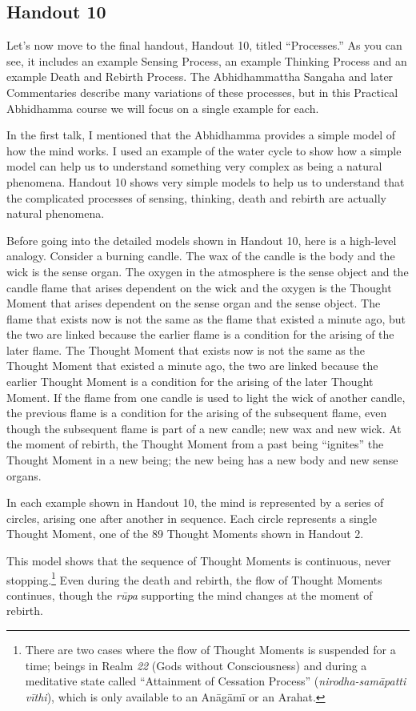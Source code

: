 \subsection*{Handout 10}

Let’s now move to the final handout, Handout 10, titled “Processes.” As you can see, it includes an example Sensing Process, an example Thinking Process and an example Death and Rebirth Process. The Abhidhammattha Sangaha and later Commentaries describe many variations of these processes, but in this Practical Abhidhamma course we will focus on a single example for each.

In the first talk, I mentioned that the Abhidhamma provides a simple model of how the mind works. I used an example of the water cycle to show how a simple model can help us to understand something very complex as being a natural phenomena. Handout 10 shows very simple models to help us to understand that the complicated processes of sensing, thinking, death and rebirth are actually natural phenomena.

Before going into the detailed models shown in Handout 10, here is a high-level analogy. Consider a burning candle. The wax of the candle is the body and the wick is the sense organ. The oxygen in the atmosphere is the sense object and the candle flame that arises dependent on the wick and the oxygen is the Thought Moment that arises dependent on the sense organ and the sense object. The flame that exists now is not the same as the flame that existed a minute ago, but the two are linked because the earlier flame is a condition for the arising of the later flame. The Thought Moment that exists now is not the same as the Thought Moment that existed a minute ago, the two are linked because the earlier Thought Moment is a condition for the arising of the later Thought Moment. If the flame from one candle is used to light the wick of another candle, the previous flame is a condition for the arising of the subsequent flame, even though the subsequent flame is part of a new candle; new wax and new wick. At the moment of rebirth, the Thought Moment from a past being “ignites” the Thought Moment in a new being; the new being has a new body and new sense organs.

In each example shown in Handout 10, the mind is represented by a series of circles, arising one after another in sequence. Each circle represents a single Thought Moment, one of the 89 Thought Moments shown in Handout 2.

This model shows that the sequence of Thought Moments is continuous, never stopping.\footnote{There are two cases where the flow of Thought Moments is suspended for a time; beings in Realm \textit{22} (Gods without Consciousness) and during a meditative state called “Attainment of Cessation Process” (\textit{nirodha-samāpatti vīthi}), which is only available to an Anāgāmī or an Arahat.} Even during the death and rebirth, the flow of Thought Moments continues, though the \textit{rūpa} supporting the mind changes at the moment of rebirth.

